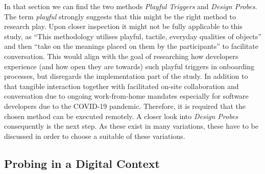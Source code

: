 In that section we can find the two methods \textit{Playful Triggers} and \textit{Design Probes}. The term \textit{playful} strongly suggests that this might be the right method to research play. Upon closer inspection it might not be fully applicable to this study, as \enquote{This methodology utilises playful, tactile, everyday qualities of objects} \cite[p. 16]{akama2010community} and then \enquote{take on the meanings placed on them by the participants} \cite[p. 16]{akama2010community} to facilitate conversation. This would align with the goal of researching how developers experience (and how open they are towards) such playful triggers in onboarding processes, but disregards the implementation part of the study. In addition to that tangible interaction together with facilitated on-site collaboration and conversation due to ongoing work-from-home mandates especially for software developers due to the COVID-19 pandemic. Therefore, it is required that the chosen method can be executed remotely. A closer look into \textit{Design Probes} consequently is the next step. As these exist in many variations, these have to be discussed in order to choose a suitable of these variations.

\subsection{Probing in a Digital Context}

